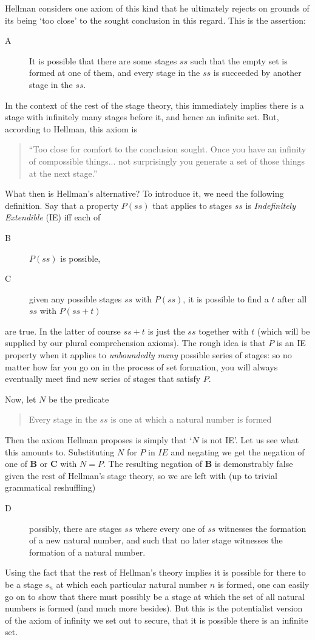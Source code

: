 \documentclass{asl}
\theoremstyle{definition}
\begin{document}
Hellman considers one axiom of this kind that he ultimately rejects on grounds of its being `too close' to the sought conclusion in this regard. This is the assertion:
\begin{description}
\item[A] It is possible that there are some stages $ss$ such that the empty set is formed at one of them, and every stage in the $ss$ is succeeded by another stage in the $ss$. 
\end{description}
In the context of the rest of the stage theory, this immediately implies there is a stage with infinitely many stages before it, and hence an infinite set. But, according to Hellman, this axiom is 
\begin{quote} ``Too close for comfort to the conclusion sought. Once you have an infinity of compossible things... not surprisingly you generate a set of those things at the next stage.''\end{quote}
What then is Hellman's alternative? To introduce it, we need the following definition. Say that a property $P(ss)$ that applies to stages $ss$ is \emph{Indefinitely Extendible} (IE) iff each of
\begin{description} \item[B] $P(ss)$ is possible,
\item[C] given any possible stages $ss$ with $P(ss)$, it is possible to find a $t$ after all $ss$ with $P(ss + t)$
\end{description}
are true. In the latter of course $ss + t$ is just the $ss$ together with $t$ (which will be supplied by our plural comprehension axioms). The rough idea is that $P$ is an IE property when it applies to \emph{unboundedly many}  possible series of stages: so no matter how far you go on in the process of set formation, you will always eventually meet find new series of stages that satisfy $P$.

Now, let $N$ be the predicate
\begin{quote} Every stage in the $ss$ is one at which a natural number is formed
\end{quote} 
Then the axiom Hellman proposes is simply that `$N$ is not IE'. Let us see what this amounts to. Substituting $N$ for $P$ in $IE$ and negating we get the negation of one of {\bf B} or {\bf C} with $N = P$. The resulting negation of {\bf B} is demonstrably false given the rest of Hellman's stage theory, so we are left with (up to trivial grammatical reshuffling)
\begin{description}\item[D] possibly, there are stages $ss$ where every one of $ss$ witnesses the formation of a new natural number, and such that no later stage witnesses the formation of a natural number.
\end{description}
Using the fact that the rest of Hellman's theory implies it is possible for there to be a stage $s_n$ at which each particular natural number $n$ is formed, one can easily go on to show that there must possibly be a stage at which the set of all natural numbers is formed (and much more besides). But this is the potentialist version of the axiom of infinity we set out to secure, that it is possible there is an infinite set.
\end{document}
